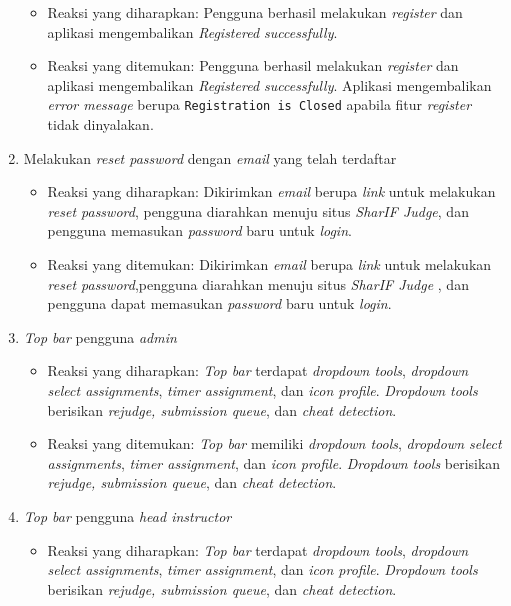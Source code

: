 \begin{enumerate}
	 	\begin{itemize}
	 		\item Reaksi yang diharapkan: Pengguna berhasil melakukan \textit{register} dan aplikasi mengembalikan \textit{Registered successfully}.
	 		\item Reaksi yang ditemukan: Pengguna berhasil melakukan \textit{register} dan aplikasi mengembalikan \textit{Registered successfully}. Aplikasi mengembalikan \textit{error message} berupa \texttt{Registration is Closed} apabila fitur \textit{register} tidak dinyalakan.
	 	\end{itemize}
	 \item Melakukan \textit{reset password} dengan \textit{email} yang telah terdaftar
	 	\begin{itemize}
	 		\item Reaksi yang diharapkan: Dikirimkan \textit{email} berupa \textit{link} untuk melakukan \textit{reset password}, pengguna diarahkan menuju situs \textit{SharIF Judge}, dan pengguna memasukan \textit{password} baru untuk \textit{login}.
	 		\item Reaksi yang ditemukan: Dikirimkan \textit{email} berupa \textit{link} untuk melakukan \textit{reset password},pengguna diarahkan menuju situs \textit{SharIF Judge} , dan pengguna dapat memasukan \textit{password} baru untuk \textit{login}.
	 	\end{itemize}
	 \item \textit{Top bar} pengguna \textit{admin}
	 \begin{itemize}
	 	\item Reaksi yang diharapkan: \textit{Top bar} terdapat \textit{dropdown tools}, \textit{dropdown select assignments}, \textit{timer assignment}, dan \textit{icon profile}. \textit{Dropdown tools} berisikan \textit{rejudge, submission queue}, dan \textit{cheat detection}.
	 	\item Reaksi yang ditemukan: \textit{Top bar} memiliki \textit{dropdown tools}, \textit{ dropdown select assignments}, \textit{timer assignment}, dan \textit{icon profile}. \textit{Dropdown tools} berisikan \textit{rejudge, submission queue}, dan \textit{cheat detection}.
	 \end{itemize}
	 \item \textit{Top bar} pengguna \textit{head instructor}
	 \begin{itemize}
	 	\item Reaksi yang diharapkan: \textit{Top bar} terdapat \textit{dropdown tools}, \textit{dropdown select assignments}, \textit{timer assignment}, dan \textit{icon profile}. \textit{Dropdown tools} berisikan \textit{rejudge, submission queue}, dan \textit{cheat detection}.

\end{itemize}
\end{enumerate}
